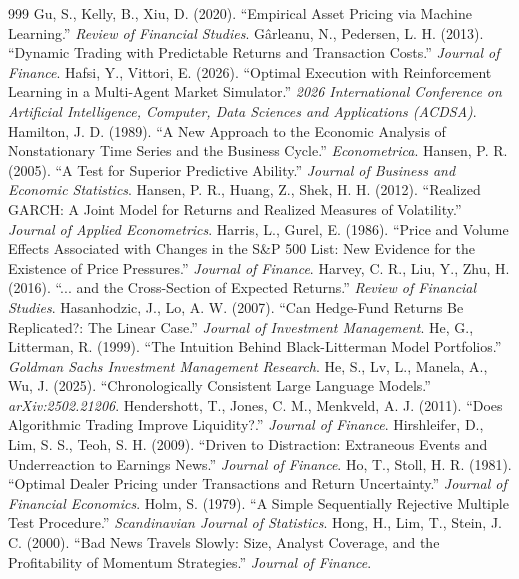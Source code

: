 \begin{thebibliography}{999}
 Gu, S., Kelly, B., Xiu, D. (2020). ``Empirical Asset Pricing via Machine Learning.'' \textit{Review of Financial Studies}.
 Gârleanu, N., Pedersen, L. H. (2013). ``Dynamic Trading with Predictable Returns and Transaction Costs.'' \textit{Journal of Finance}.
 Hafsi, Y., Vittori, E. (2026). ``Optimal Execution with Reinforcement Learning in a Multi-Agent Market Simulator.'' \textit{2026 International Conference on Artificial Intelligence, Computer, Data Sciences and Applications (ACDSA)}.
 Hamilton, J. D. (1989). ``A New Approach to the Economic Analysis of Nonstationary Time Series and the Business Cycle.'' \textit{Econometrica}.
 Hansen, P. R. (2005). ``A Test for Superior Predictive Ability.'' \textit{Journal of Business and Economic Statistics}.
 Hansen, P. R., Huang, Z., Shek, H. H. (2012). ``Realized GARCH: A Joint Model for Returns and Realized Measures of Volatility.'' \textit{Journal of Applied Econometrics}.
 Harris, L., Gurel, E. (1986). ``Price and Volume Effects Associated with Changes in the S\&P 500 List: New Evidence for the Existence of Price Pressures.'' \textit{Journal of Finance}.
 Harvey, C. R., Liu, Y., Zhu, H. (2016). ``... and the Cross-Section of Expected Returns.'' \textit{Review of Financial Studies}.
 Hasanhodzic, J., Lo, A. W. (2007). ``Can Hedge-Fund Returns Be Replicated?: The Linear Case.'' \textit{Journal of Investment Management}.
 He, G., Litterman, R. (1999). ``The Intuition Behind Black-Litterman Model Portfolios.'' \textit{Goldman Sachs Investment Management Research}.
 He, S., Lv, L., Manela, A., Wu, J. (2025). ``Chronologically Consistent Large Language Models.'' \textit{arXiv:2502.21206}.
 Hendershott, T., Jones, C. M., Menkveld, A. J. (2011). ``Does Algorithmic Trading Improve Liquidity?.'' \textit{Journal of Finance}.
 Hirshleifer, D., Lim, S. S., Teoh, S. H. (2009). ``Driven to Distraction: Extraneous Events and Underreaction to Earnings News.'' \textit{Journal of Finance}.
 Ho, T., Stoll, H. R. (1981). ``Optimal Dealer Pricing under Transactions and Return Uncertainty.'' \textit{Journal of Financial Economics}.
 Holm, S. (1979). ``A Simple Sequentially Rejective Multiple Test Procedure.'' \textit{Scandinavian Journal of Statistics}.
 Hong, H., Lim, T., Stein, J. C. (2000). ``Bad News Travels Slowly: Size, Analyst Coverage, and the Profitability of Momentum Strategies.'' \textit{Journal of Finance}.

\end{thebibliography}
